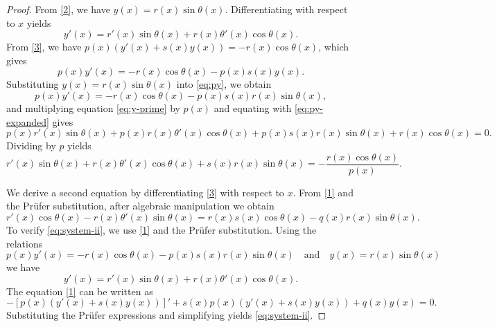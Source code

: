 \documentclass[11pt, reqno]{amsart}
\numberwithin{equation}{section}  %
\theoremstyle{plain}
\theoremstyle{definition}
\theoremstyle{remark}
\begin{document}
\begin{proof}
From \eqref{2}, we have $y(x) = r(x) \sin\theta(x)$. Differentiating with respect to $x$ yields
\begin{equation}\label{eq:y-prime}
y'(x) = r'(x)\sin\theta(x) + r(x)\theta'(x)\cos\theta(x).
\end{equation}
From \eqref{3}, we have $p(x)(y'(x) + s(x)y(x)) = -r(x)\cos\theta(x)$, which gives
\begin{equation}\label{eq:py}
p(x)y'(x) = -r(x)\cos\theta(x) - p(x)s(x)y(x).
\end{equation}
Substituting $y(x) = r(x)\sin\theta (x)$ into \eqref{eq:py}, we obtain
\begin{equation}\label{eq:py-expanded}
p(x)y'(x) = -r(x)\cos\theta(x) - p(x)s(x)r(x)\sin\theta(x),
\end{equation}
and multiplying equation \eqref{eq:y-prime} by $p(x)$ and equating with \eqref{eq:py-expanded} gives
\begin{equation}\label{eq:intermediate-1}
p(x)r'(x)\sin\theta(x) + p(x)r(x)\theta'(x)\cos\theta(x) + p(x)s(x)r(x)\sin\theta(x) + r(x)\cos\theta(x) = 0.
\end{equation}
Dividing by $p$ yields
\begin{equation}\label{eq:star-star}
r'(x)\sin\theta(x) + r(x)\theta'(x)\cos\theta(x) + s(x)r(x)\sin\theta(x) = -\frac{r(x)\cos\theta(x)}{p(x)}.
\end{equation}

We derive a second equation by differentiating \eqref{3} with respect to $x$. From \eqref{1} and the Pr\"ufer substitution, after algebraic manipulation we obtain
\begin{equation}\label{eq:system-ii}
r'(x)\cos\theta (x)- r(x)\theta'(x)\sin\theta(x) = r(x)s(x)\cos\theta(x) - q(x)r(x)\sin\theta(x). \tag{ii}
\end{equation}
To verify \eqref{eq:system-ii}, we use \eqref{1} and the Pr\"ufer substitution. Using the relations
\[
p(x)y'(x) = -r(x)\cos\theta(x) - p(x)s(x)r(x)\sin\theta(x) \quad \text{and} \quad y (x)= r(x)\sin\theta(x)
\]
we have 
\[
y'(x) = r'(x)\sin\theta(x) + r(x)\theta'(x)\cos\theta(x).
\]
The equation \eqref{1} can be written as
\begin{equation*}
-[p(x)(y'(x) + s(x)y(x))]' + s(x)p(x)(y'(x) + s(x)y(x)) + q(x)y(x) = 0.
\end{equation*}
Substituting the Pr\"ufer expressions and simplifying yields \eqref{eq:system-ii}.


\end{proof}
\end{document}
